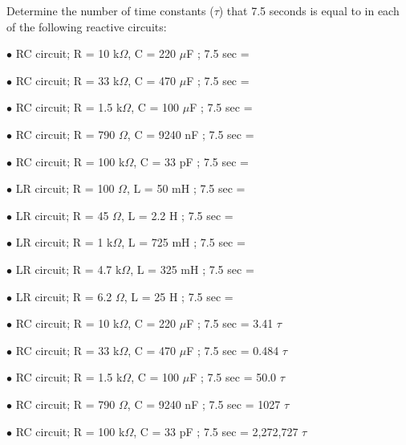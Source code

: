 

Determine the number of time constants ($\tau$) that 7.5 seconds is equal to in each of the following reactive circuits:

\medskip
\item{$\bullet$} RC circuit; R = 10 k$\Omega$, C = 220 $\mu$F ; 7.5 sec = 
\item{$\bullet$} RC circuit; R = 33 k$\Omega$, C = 470 $\mu$F ; 7.5 sec =
\item{$\bullet$} RC circuit; R = 1.5 k$\Omega$, C = 100 $\mu$F ; 7.5 sec =
\item{$\bullet$} RC circuit; R = 790 $\Omega$, C = 9240 nF ; 7.5 sec =
\item{$\bullet$} RC circuit; R = 100 k$\Omega$, C = 33 pF ; 7.5 sec =

\vskip 10pt

\item{$\bullet$} LR circuit; R = 100 $\Omega$, L = 50 mH ; 7.5 sec =
\item{$\bullet$} LR circuit; R = 45 $\Omega$, L = 2.2 H ; 7.5 sec =
\item{$\bullet$} LR circuit; R = 1 k$\Omega$, L = 725 mH ; 7.5 sec =
\item{$\bullet$} LR circuit; R = 4.7 k$\Omega$, L = 325 mH ; 7.5 sec =
\item{$\bullet$} LR circuit; R = 6.2 $\Omega$, L = 25 H ; 7.5 sec =
\medskip







\item{$\bullet$} RC circuit; R = 10 k$\Omega$, C = 220 $\mu$F ; 7.5 sec = 3.41 $\tau$
\item{$\bullet$} RC circuit; R = 33 k$\Omega$, C = 470 $\mu$F ; 7.5 sec = 0.484 $\tau$ 
\item{$\bullet$} RC circuit; R = 1.5 k$\Omega$, C = 100 $\mu$F ; 7.5 sec = 50.0 $\tau$
\item{$\bullet$} RC circuit; R = 790 $\Omega$, C = 9240 nF ; 7.5 sec = 1027 $\tau$
\item{$\bullet$} RC circuit; R = 100 k$\Omega$, C = 33 pF ; 7.5 sec = 2,272,727 $\tau$

\vskip 10pt

